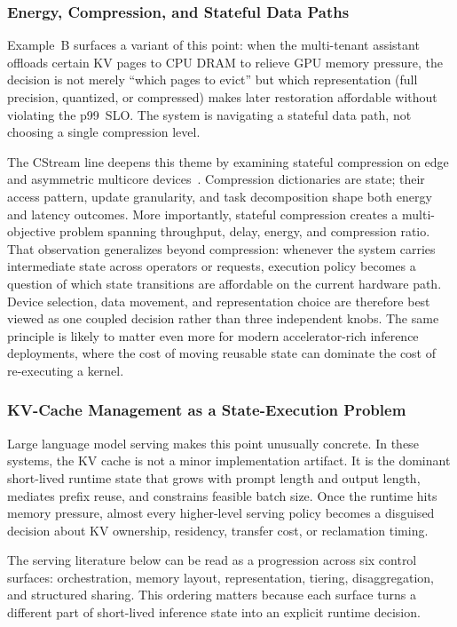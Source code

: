 \documentclass[acmsmall,screen,review]{acmart}
\begin{document}
\subsubsection{Energy, Compression, and Stateful Data Paths}

Example~B surfaces a variant of this point: when the multi-tenant assistant offloads certain KV pages to CPU DRAM to relieve GPU memory pressure, the decision is not merely ``which pages to evict'' but which representation (full precision, quantized, or compressed) makes later restoration affordable without violating the p99~SLO. The system is navigating a stateful data path, not choosing a single compression level.

The CStream line deepens this theme by examining stateful compression on edge and asymmetric multicore devices~\cite{zeng2023cstreamicde,zeng2024cstream}. Compression dictionaries are state; their access pattern, update granularity, and task decomposition shape both energy and latency outcomes. More importantly, stateful compression creates a multi-objective problem spanning throughput, delay, energy, and compression ratio. That observation generalizes beyond compression: whenever the system carries intermediate state across operators or requests, execution policy becomes a question of which state transitions are affordable on the current hardware path. Device selection, data movement, and representation choice are therefore best viewed as one coupled decision rather than three independent knobs. The same principle is likely to matter even more for modern accelerator-rich inference deployments, where the cost of moving reusable state can dominate the cost of re-executing a kernel.

\subsubsection{KV-Cache Management as a State-Execution Problem}

Large language model serving makes this point unusually concrete. In these systems, the KV cache is not a minor implementation artifact. It is the dominant short-lived runtime state that grows with prompt length and output length, mediates prefix reuse, and constrains feasible batch size. Once the runtime hits memory pressure, almost every higher-level serving policy becomes a disguised decision about KV ownership, residency, transfer cost, or reclamation timing.

The serving literature below can be read as a progression across six control surfaces: orchestration, memory layout, representation, tiering, disaggregation, and structured sharing. This ordering matters because each surface turns a different part of short-lived inference state into an explicit runtime decision.
\end{document}
